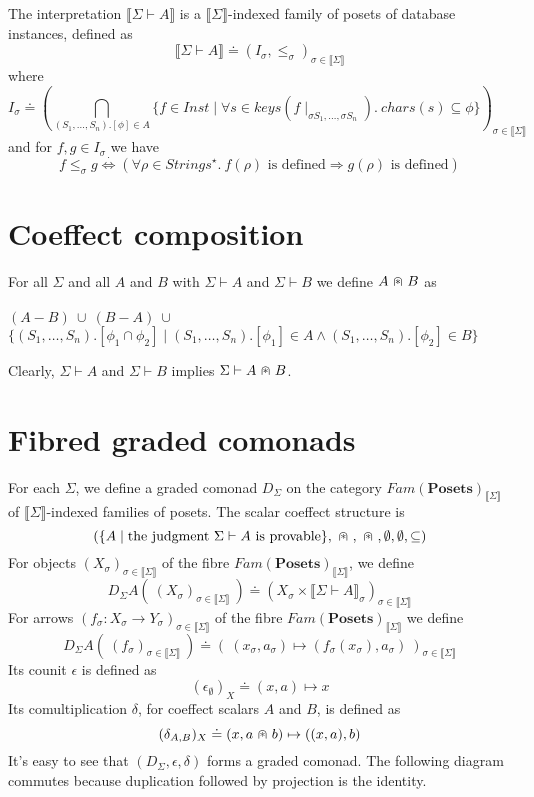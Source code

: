 \documentclass{article}
\newcommand{\mbf}{\mathbf}
\newcommand{\sem}[1]{\llbracket #1 \rrbracket}
\newcommand{\capdot}{~\stackinset{c}{}{c}{}{\scalebox{0.8}{$\ast$}}{$\cap$}~}
\newcommand{\sdisp}[1]{
\left( #1 \right)
}
\begin{document}
The interpretation $\sem{\Sigma \vdash A}$ is a $\sem{\Sigma}$-indexed family of posets of database instances, defined as $$\sem{\Sigma \vdash A} \doteq (I_\sigma, \leq_\sigma)_{\sigma \in \sem{\Sigma}}$$ where $$I_\sigma \doteq \sdisp{\bigcap_{(S_1,\ldots,S_n).[\phi] \in A} \{ f \in \mathit{Inst} \mid \forall s \in \mathit{keys}(f \! \mid_{\sigma S_1, \ldots, \sigma S_n}).~\mathit{chars}(s) \subseteq \phi \}}_{\sigma \in \sem{\Sigma}}$$ and for $f,g \in I_{\sigma}$ we have
$$f \leq_\sigma g \overset{\cdot}{\Leftrightarrow} (\forall \rho \in \mathit{Strings}^\star.~f(\rho) \text{ is defined} \Rightarrow g(\rho) \text{ is defined})$$
 
\section*{Coeffect composition}

For all $\Sigma$ and all $A$ and $B$ with $\Sigma \vdash A$ and $\Sigma \vdash B$ we define $A \capdot B$ as\\~\\
$(A - B)~\cup~(B - A)~\cup$\\
$\{ (S_1,\ldots,S_n).[\phi_1 \cap \phi_2] \mid (S_1,\ldots,S_n).[\phi_1] \in A \wedge (S_1,\ldots,S_n).[\phi_2] \in B \}$ 

Clearly, $\Sigma \vdash A$ and $\Sigma \vdash B$ implies $\Sigma \vdash A \capdot B$. 
\section*{Fibred graded comonads}
 
For each $\Sigma$, we define a graded comonad $D_{\Sigma}$ on the category $\mathit{Fam}(\mbf{Posets})_{\sem{\Sigma}}$ of $\sem{\Sigma}$-indexed families of posets. The scalar coeffect structure is $$( \{ A \mid \text{the judgment } \Sigma \vdash A \text{ is provable} \}, \capdot, \capdot, \emptyset, \emptyset, \subseteq)$$ For objects $(X_\sigma)_{\sigma \in \sem{\Sigma}}$ of the fibre $\mathit{Fam}(\mbf{Posets})_{\sem{\Sigma}}$, we define $$D_{\Sigma} A(~(X_\sigma)_{\sigma \in \sem{\Sigma}}~) \doteq (X_\sigma \times \sem{\Sigma \vdash A}_\sigma)_{\sigma \in \sem{\Sigma}}$$ For arrows $(f_\sigma : X_\sigma \to Y_\sigma)_{\sigma \in \sem{\Sigma}}$ of the fibre $\mathit{Fam}(\mbf{Posets})_{\sem{\Sigma}}$ we define $$D_{\Sigma} A(~(f_\sigma)_{\sigma \in \sem{\Sigma}}~) \doteq (~(x_\sigma, a_\sigma) \mapsto (f_\sigma(x_\sigma),a_\sigma)~)_{\sigma \in \sem{\Sigma}}$$ Its counit $\epsilon$ is defined as $$(\epsilon_{\emptyset})_X \doteq (x,a) \mapsto x
$$ Its comultiplication $\delta$, for coeffect scalars $A$ and $B$, is defined as $$(\delta_{A,B})_X \doteq (x,a \capdot b) \mapsto ((x, a), b)$$ 
It's easy to see that $(D_{\Sigma}, \epsilon, \delta)$ forms a graded comonad. The following diagram commutes because duplication followed by projection is the identity.
\end{document}
